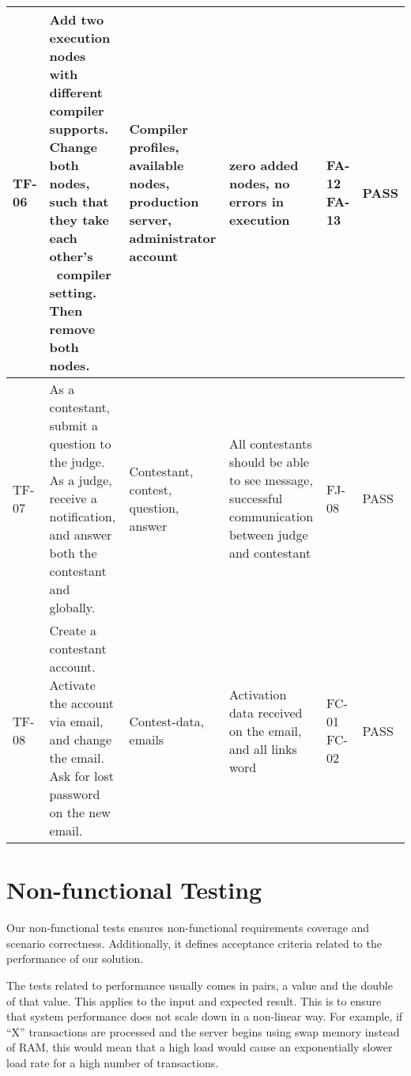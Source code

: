 \begin{longtable}{|l|p{3cm}|p{3cm}|p{3cm}|p{1.1cm}|l|}
TF-06 & Add two execution nodes with different compiler supports. Change both
nodes, such that they take each other's \ compiler setting. Then remove both
nodes. &
Compiler profiles, available nodes, production server, administrator account &
zero added nodes, no errors in execution & FA-12 FA-13 & PASS\\
\hline 

TF-07 & As a contestant, submit a question to the judge. As a judge, receive a
notification, and answer both the contestant and globally. &
Contestant, contest, question, answer &
All contestants should be able to see message, successful communication between
judge and contestant & FJ-08 & PASS\\
\hline

TF-08 & Create a contestant account. Activate the account via email, and change
the email. Ask for lost password on the new  email. &
Contest-data, emails & Activation data received on the email, and all links
word & FC-01 FC-02 & PASS\\
\hline
\end{longtable}


\section{Non-functional Testing}
Our non-functional tests ensures non-functional requirements coverage and
scenario correctness. Additionally, it defines acceptance criteria related to
the performance of our solution.

The tests related to performance usually comes in pairs, a value and the double
of that value. This applies to the input and expected result.  This is to
ensure that system performance does not scale down in a non-linear way. For
example, if ``X'' transactions are processed and the server begins using swap
memory instead of RAM, this would mean that a high load would cause an
exponentially slower load rate for a high number of transactions.


